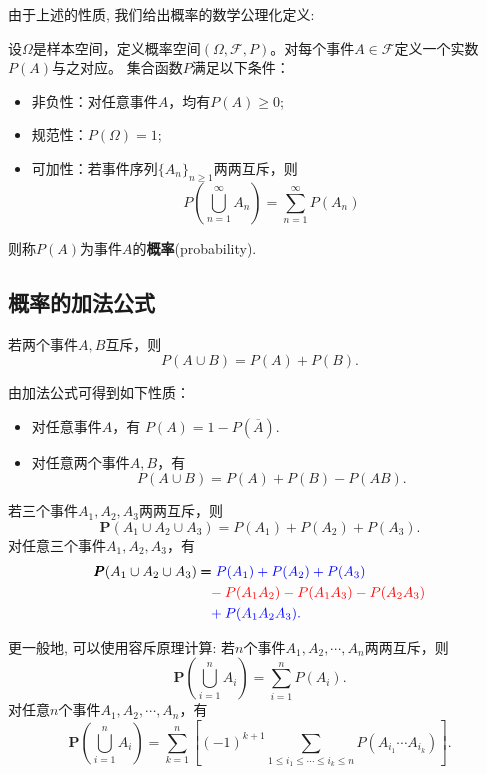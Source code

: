 由于上述的性质, 我们给出概率的数学公理化定义: 
\begin{definition}[概率的公理化定义]
    设$\Omega$是样本空间，定义概率空间$(\Omega,\mathcal{F},P)$。对每个事件$A\in \mathcal{F}$定义一个实数$P(A)$与之对应。
    集合函数$P$满足以下条件：
    \begin{itemize}
        \item 非负性：对任意事件$A$，均有$P(A)\ge 0$; 
        \item 规范性：$P(\Omega)=1$; 
        \item 可加性：若事件序列$\{A_n\}_{n\ge 1}$两两互斥，则
              $$P \left( \bigcup_{n=1}^{\infty} A_n \right)=\sum_{n=1}^{\infty} P(A_n)$$
    \end{itemize}
    则称$P(A)$为事件$A$的\textbf{概率}(probability). 
\end{definition}

\subsection{概率的加法公式}
\begin{proposition}[加法公式]
    若两个事件$A,B$互斥，则
    $$P(A\cup B)=P(A)+P(B).$$
\end{proposition}

\begin{remark}
    由加法公式可得到如下性质：
    \begin{itemize}
        \item 对任意事件$A$，有
              $P(A)=1-P\left(\overline{A}\right).$
        \item 对任意两个事件$A,B$，有
              $$P(A\cup B)=P(A)+P(B)-P(AB).$$
    \end{itemize}
\end{remark}

\begin{remark}
    若三个事件$A_1, A_2, A_3$两两互斥，则
    $$\pmb P(A_1 \cup A_2 \cup A_3) = P(A_1)+P(A_2)+P(A_3).$$
    对任意三个事件$A_1, A_2, A_3$，有
    \begin{align*}
        \pmb P(A_1 \cup A_2 \cup A_3) & \pmb=\color{blue}P(A_1)+P(A_2)+P(A_3)              \\
                                      & \phantom=\color{red}-P(A_1A_2)-P(A_1A_3)-P(A_2A_3) \\
                                      & \phantom=\color{blue}+P(A_1A_2A_3).
    \end{align*}%
\end{remark}

\begin{remark}
    更一般地, 可以使用容斥原理计算: 
    若$n$个事件$A_1, A_2, \cdots, A_n$两两互斥，则
    $$\pmb P\left( \bigcup_{i=1}^n A_i \right)=\sum_{i=1}^n P(A_i).$$
    \vspace{0.2in}
    对任意$n$个事件$A_1, A_2, \cdots, A_n$，有
    $$\pmb P\left( \bigcup_{i=1}^n A_i \right)=\sum_{k=1}^n \left[ (-1)^{k+1} \sum_{1\le i_1\le \cdots\le i_k \le n} P(A_{i_1}\cdots A_{i_k}) \right].$$
\end{remark}




